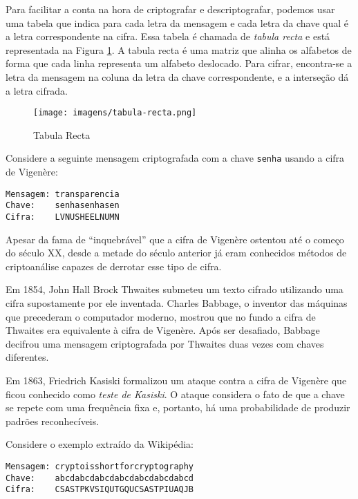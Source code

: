Para facilitar a conta na hora de criptografar e descriptografar, podemos usar uma tabela que indica para cada letra da mensagem e cada letra da chave qual é a letra correspondente na cifra.
Essa tabela é chamada de {\em tabula recta} e está representada na Figura \ref{fig:tabula-recta}.
A tabula recta é uma matriz que alinha os alfabetos de forma que cada linha representa um alfabeto deslocado.
Para cifrar, encontra-se a letra da mensagem na coluna da letra da chave correspondente, e a interseção dá a letra cifrada.

\begin{figure}[htbp]
  \centering
  \texttt{[image: imagens/tabula-recta.png]}
  \caption{Tabula Recta}
  \label{fig:tabula-recta}
\end{figure}


\begin{example}
  Considere a seguinte mensagem criptografada com a chave {\tt senha} usando a cifra de Vigenère:

\begin{verbatim}
Mensagem: transparencia
Chave:    senhasenhasen
Cifra:    LVNUSHEELNUMN
\end{verbatim}
\end{example}

Apesar da fama de ``inquebrável'' que a cifra de Vigenère ostentou até o começo do século XX, desde a metade do século anterior já eram conhecidos métodos de criptoanálise capazes de derrotar esse tipo de cifra.

Em 1854, John Hall Brock Thwaites submeteu um texto cifrado utilizando uma cifra supostamente por ele inventada.
Charles Babbage, o inventor das máquinas que precederam o computador moderno, mostrou que no fundo a cifra de Thwaites era equivalente à cifra de Vigenère.
Após ser desafiado, Babbage decifrou uma mensagem criptografada por Thwaites duas vezes com chaves diferentes.

Em 1863, Friedrich Kasiski formalizou um ataque contra a cifra de Vigenère que ficou conhecido como {\em teste de Kasiski}.
O ataque considera o fato de que a chave se repete com uma frequência fixa e, portanto, há uma probabilidade de produzir padrões reconhecíveis.

\begin{example}
  Considere o exemplo extraído da Wikipédia:
  
\begin{verbatim}
Mensagem: cryptoisshortforcryptography
Chave:    abcdabcdabcdabcdabcdabcdabcd
Cifra:    CSASTPKVSIQUTGQUCSASTPIUAQJB
\end{verbatim}
\end{example}

